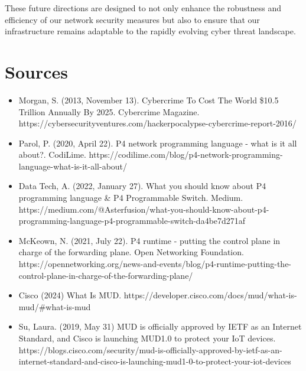 These future directions are designed to not only enhance the robustness and efficiency of our network security measures but also to ensure that our infrastructure remains adaptable to the rapidly evolving cyber threat landscape. 
\pagebreak

\section{Sources}
\begin{itemize}
    \item Morgan, S. (2013, November 13). Cybercrime To Cost The World \$10.5 Trillion Annually By 2025. Cybercrime Magazine. https://cybersecurityventures.com/hackerpocalypse-cybercrime-report-2016/
    \item Parol, P. (2020, April 22). P4 network programming language - what is it all about?. CodiLime. https://codilime.com/blog/p4-network-programming-language-what-is-it-all-about/
    \item Data Tech, A. (2022, January 27). What you should know about P4 programming language \& P4 Programmable Switch. Medium. 
    https://medium.com/@Asterfusion/what-you-should-know-about-p4-programming-language-p4-programmable-switch-da4be7d271af
    \item McKeown, N. (2021, July 22). P4 runtime - putting the control plane in charge of the forwarding plane. Open Networking Foundation. https://opennetworking.org/news-and-events/blog/p4-runtime-putting-the-control-plane-in-charge-of-the-forwarding-plane/
    \item Cisco (2024) What Is MUD. https://developer.cisco.com/docs/mud/what-is-mud/#what-is-mud
    \item Su, Laura. (2019, May 31) MUD is officially approved by IETF as an Internet Standard, and Cisco is launching MUD1.0 to protect your IoT devices. https://blogs.cisco.com/security/mud-is-officially-approved-by-ietf-as-an-internet-standard-and-cisco-is-launching-mud1-0-to-protect-your-iot-devices
\end{itemize}

